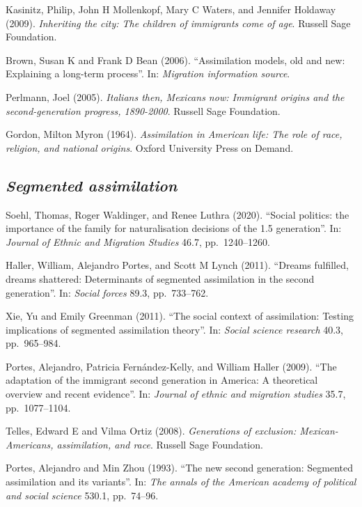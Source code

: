 \documentclass[
  12pt,
]{article}
\begin{document}
Kasinitz, Philip, John H Mollenkopf, Mary C Waters, and Jennifer
Holdaway (2009).
\emph{Inheriting the city: The children of immigrants come of age}.
Russell Sage Foundation.

Brown, Susan K and Frank D Bean (2006). ``Assimilation models, old and
new: Explaining a long-term process''. In:
\emph{Migration information source}.

Perlmann, Joel (2005).
\emph{Italians then, Mexicans now: Immigrant origins and the second-generation progress, 1890-2000}.
Russell Sage Foundation.

Gordon, Milton Myron (1964).
\emph{Assimilation in American life: The role of race, religion, and national origins}.
Oxford University Press on Demand.

\hypertarget{segmented-assimilation}{%
\subsection{\texorpdfstring{\emph{Segmented
assimilation}}{Segmented assimilation}}\label{segmented-assimilation}}

Soehl, Thomas, Roger Waldinger, and Renee Luthra (2020). ``Social
politics: the importance of the family for naturalisation decisions of
the 1.5 generation''. In: \emph{Journal of Ethnic and Migration Studies}
46.7, pp.~1240--1260.

Haller, William, Alejandro Portes, and Scott M Lynch (2011). ``Dreams
fulfilled, dreams shattered: Determinants of segmented assimilation in
the second generation''. In: \emph{Social forces} 89.3, pp.~733--762.

Xie, Yu and Emily Greenman (2011). ``The social context of assimilation:
Testing implications of segmented assimilation theory''. In:
\emph{Social science research} 40.3, pp.~965--984.

Portes, Alejandro, Patricia Fernández-Kelly, and William Haller (2009).
``The adaptation of the immigrant second generation in America: A
theoretical overview and recent evidence''. In:
\emph{Journal of ethnic and migration studies} 35.7, pp.~1077--1104.

Telles, Edward E and Vilma Ortiz (2008).
\emph{Generations of exclusion: Mexican-Americans, assimilation, and race}.
Russell Sage Foundation.

Portes, Alejandro and Min Zhou (1993). ``The new second generation:
Segmented assimilation and its variants''. In:
\emph{The annals of the American academy of political and social science}
530.1, pp.~74--96.
\end{document}
